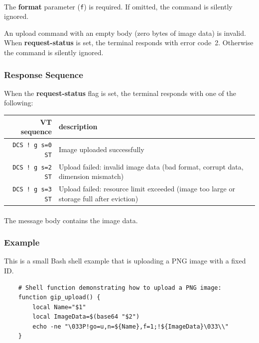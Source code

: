 \documentclass[a4paper]{article}
\newcommand{\code}[1]{\colorbox{light-gray}{\texttt{#1}}}
\begin{document}
\paragraph*{}
The \textbf{format} parameter (\code{f}) is required.
If omitted, the command is silently ignored.

An upload command with an empty body (zero bytes of image data) is invalid.
When \textbf{request-status} is set, the terminal responds with error code~2.
Otherwise the command is silently ignored.

\subsubsection*{Response Sequence}

When the \textbf{request-status} flag is set, the terminal responds with one of the following:

\begin{tabular}{ |r|l| }
    \hline
    \textbf{VT sequence} & \textbf{description} \\
    \hline
    \code{DCS ! g s=0 ST} & Image uploaded successfully \\
    \code{DCS ! g s=2 ST} & Upload failed: invalid image data (bad format, corrupt data, dimension mismatch) \\
    \code{DCS ! g s=3 ST} & Upload failed: resource limit exceeded (image too large or storage full after eviction) \\
    \hline
\end{tabular}

\paragraph*{}

The message body contains the image data.

\subsubsection*{Example}

This is a small Bash shell example that is uploading a PNG image with a fixed ID.

\begin{verbatim}
    # Shell function demonstrating how to upload a PNG image:
    function gip_upload() {
        local Name="$1"
        local ImageData=$(base64 "$2")
        echo -ne "\033P!go=u,n=${Name},f=1;!${ImageData}\033\\"
    }
\end{verbatim}
\end{document}
